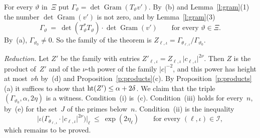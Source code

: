 \documentclass[11pt,a4paper]{article}
\makeatletter
\newcommand{\m}[1]{\mbox{$#1$}}        %
\theoremstyle{plainx}
\theoremstyle{uprightx}
\renewenvironment{proof}[1][Proof]{\par\pushQED{\qed}\normalfont\topsep0pt\partopsep0pt
  \trivlist\item[\hskip\labelsep\itshape #1.]\ignorespaces}{\popQED\endtrivlist\@endpefalse}
\newcommand{\IX}{\mathcal{I}}
\newcommand{\Gram}{\operatorname{Gram}}
\newcommand{\abs}[1]{\lvert #1\rvert}
\makeatother
\begin{document}
\begin{proof}[Proof of Theorem 2]
For every $\vartheta$ in~$\Xi$ put \m{\Gamma_\vartheta=\det\Gram(T_\vartheta v')}. By~(b) and
Lemma~\ref{l:gram}(1) the number $\det\Gram(v')$ is not zero, and by Lemma~\ref{l:gram}(3)
\[\Gamma_\vartheta\ =\ \det(T_\vartheta^{*}T_\vartheta)\cdot\det\Gram(v')\qquad\text{for every }\vartheta\in\Xi .\]
By~(a), \m{\Gamma_{\vartheta_0}\ne0}. So the family of the theorem is
\m{Z_{\ell,\iota}=\Gamma_{\theta_{\ell,\iota}}/\Gamma_{\vartheta_0}}.

\emph{Reduction.} Let $Z'$ be the family with entries \m{Z'_{\ell,\iota}=Z_{\ell,\iota}\,\abs{c_{\ell,\iota}}^{2\nu}}. Then
$Z$ is the product of~$Z'$ and of the $\nu$-th power of the family $\abs{c}^{-2}$, and this power has height at
most~$\nu h$ by~(d) and Proposition~\ref{p:products}(c). By Proposition~\ref{p:products}(a) it suffices to show
that \m{\hle{\alpha+2\delta}{Z'}}. We claim that the triple $(\Gamma_{\vartheta_0},\alpha,2\eta)$ is a witness.
Condition~(i) is~(c). Condition~(iii) holds for every~$n$, by~(e) for the set~$J$ of the primes below~$n$.
Condition~(ii) is the inequality
\begin{equation}\label{e:ladic}
\bigl\lvert\iota\bigl(\Gamma_{\theta_{\ell,\iota}}\cdot\abs{c_{\ell,\iota}}^{2\nu}\bigr)\bigr\rvert_\ell\ \le\ \exp(2\eta_\ell)
\qquad\text{for every }(\ell,\iota)\in\IX,
\end{equation}
which remains to be proved.


\end{proof}
\end{document}
